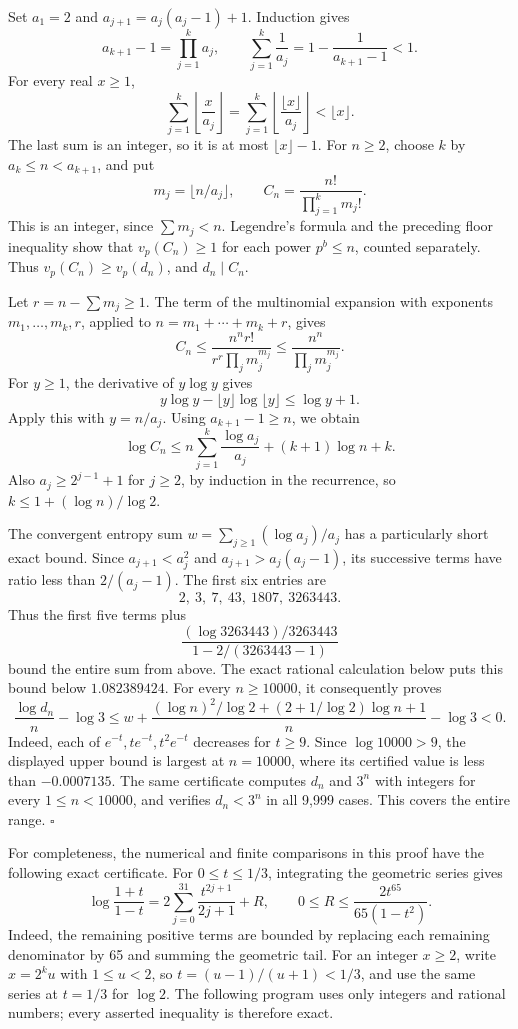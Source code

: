 \documentclass[
  11pt,
  a4paper,
]{article}
\begin{document}
Set \(a_1=2\) and \(a_{j+1}=a_j(a_j-1)+1\). Induction gives \[
a_{k+1}-1=\prod_{j=1}^k a_j,\qquad
\sum_{j=1}^k\frac1{a_j}=1-\frac1{a_{k+1}-1}<1.
\] For every real \(x\ge1\), \[
\sum_{j=1}^k\left\lfloor\frac{x}{a_j}\right\rfloor
=\sum_{j=1}^k\left\lfloor\frac{\lfloor x\rfloor}{a_j}\right\rfloor
<\lfloor x\rfloor.
\] The last sum is an integer, so it is at most \(\lfloor x\rfloor-1\).
For \(n\ge2\), choose \(k\) by \(a_k\le n<a_{k+1}\), and put \[
m_j=\lfloor n/a_j\rfloor,\qquad
C_n=\frac{n!}{\prod_{j=1}^k m_j!}.
\] This is an integer, since \(\sum m_j<n\). Legendre's formula and the
preceding floor inequality show that \(v_p(C_n)\ge1\) for each power
\(p^b\le n\), counted separately. Thus \(v_p(C_n)\ge v_p(d_n)\), and
\(d_n\mid C_n\).

Let \(r=n-\sum m_j\ge1\). The term of the multinomial expansion with
exponents \(m_1,\ldots,m_k,r\), applied to \(n=m_1+\cdots+m_k+r\), gives
\[
C_n\le\frac{n^n r!}{r^r\prod_j m_j^{m_j}}
\le\frac{n^n}{\prod_j m_j^{m_j}}.
\] For \(y\ge1\), the derivative of \(y\log y\) gives \[
y\log y-\lfloor y\rfloor\log\lfloor y\rfloor
\le\log y+1.
\] Apply this with \(y=n/a_j\). Using \(a_{k+1}-1\ge n\), we obtain \[
\log C_n
\le n\sum_{j=1}^k\frac{\log a_j}{a_j}
+(k+1)\log n+k.
\] Also \(a_j\ge2^{j-1}+1\) for \(j\ge2\), by induction in the
recurrence, so \(k\le1+(\log n)/\log2\).

The convergent entropy sum \(w=\sum_{j\ge1}(\log a_j)/a_j\) has a
particularly short exact bound. Since \(a_{j+1}<a_j^2\) and
\(a_{j+1}>a_j(a_j-1)\), its successive terms have ratio less than
\(2/(a_j-1)\). The first six entries are \[
2,\ 3,\ 7,\ 43,\ 1807,\ 3263443.
\] Thus the first five terms plus \[
\frac{(\log3263443)/3263443}{1-2/(3263443-1)}
\] bound the entire sum from above. The exact rational calculation below
puts this bound below \(1.082389424\). For every \(n\ge10000\), it
consequently proves \[
\frac{\log d_n}{n}-\log3
\le
w+\frac{(\log n)^2/\log2+(2+1/\log2)\log n+1}{n}-\log3<0.
\] Indeed, each of \(e^{-t},te^{-t},t^2e^{-t}\) decreases for \(t\ge9\).
Since \(\log10000>9\), the displayed upper bound is largest at
\(n=10000\), where its certified value is less than \(-0.0007135\). The
same certificate computes \(d_n\) and \(3^n\) with integers for every
\(1\le n<10000\), and verifies \(d_n<3^n\) in all 9,999 cases. This
covers the entire range. \(\square\)

For completeness, the numerical and finite comparisons in this proof
have the following exact certificate. For \(0\le t\le1/3\), integrating
the geometric series gives \[
\log\frac{1+t}{1-t}
=2\sum_{j=0}^{31}\frac{t^{2j+1}}{2j+1}+R,
\qquad
0\le R\le\frac{2t^{65}}{65(1-t^2)}.
\] Indeed, the remaining positive terms are bounded by replacing each
remaining denominator by 65 and summing the geometric tail. For an
integer \(x\ge2\), write \(x=2^k u\) with \(1\le u<2\), so
\(t=(u-1)/(u+1)<1/3\), and use the same series at \(t=1/3\) for
\(\log2\). The following program uses only integers and rational
numbers; every asserted inequality is therefore exact.
\end{document}
